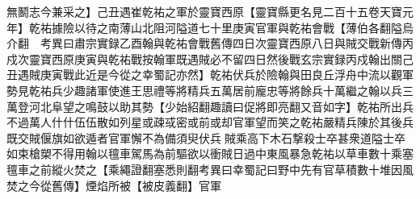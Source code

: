 無鬭志今兼采之】己丑遇崔乾祐之軍於靈寶西原【靈寶縣更名見二百十五卷天寶元年】乾祐據險以待之南薄山北阻河隘道七十里庚寅官軍與乾祐會戰【薄伯各翻隘烏介翻　考異曰肅宗實録乙酉翰與乾祐會戰舊傳四日次靈寶西原八日與賊交戰新傳丙戍次靈寶西原庚寅與乾祐戰按翰軍既遇賊必不留四日然後戰玄宗實録丙戍翰出關己丑遇賊庚寅戰此近是今從之幸蜀記亦然】乾祐伏兵於險翰與田良丘浮舟中流以觀軍勢見乾祐兵少趣諸軍使進王思禮等將精兵五萬居前龐忠等將餘兵十萬繼之翰以兵三萬登河北阜望之鳴鼓以助其勢【少始紹翻趣讀曰促將即亮翻又音如字】乾祐所出兵不過萬人什什伍伍散如列星或疎㦯密或前或却官軍望而笑之乾祐嚴精兵陳於其後兵既交賊偃旗如欲遁者官軍懈不為備須臾伏兵賊乘高下木石撃殺士卒甚衆道隘士卒如束槍槊不得用翰以氊車駕馬為前驅欲以衝賊日過中東風暴急乾祐以草車數十乘塞氊車之前縱火焚之【乘繩證翻塞悉則翻考異曰幸蜀記曰野中先有官草積數十堆因風焚之今從舊傳】煙焰所被【被皮義翻】官軍

